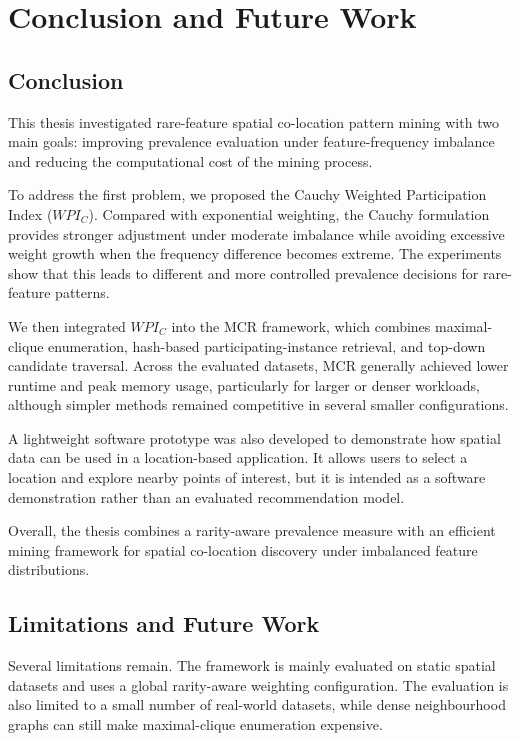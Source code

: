 \documentclass[12pt, letterpaper]{template}
\theoremstyle{definition}
\begin{document}
\section{Conclusion and Future Work}\label{con}

\subsection{Conclusion}

This thesis investigated rare-feature spatial co-location pattern mining with
two main goals: improving prevalence evaluation under feature-frequency
imbalance and reducing the computational cost of the mining process.

To address the first problem, we proposed the Cauchy Weighted Participation
Index ($WPI_C$). Compared with exponential weighting, the Cauchy formulation
provides stronger adjustment under moderate imbalance while avoiding excessive
weight growth when the frequency difference becomes extreme. The experiments
show that this leads to different and more controlled prevalence decisions for
rare-feature patterns.

We then integrated $WPI_C$ into the MCR framework, which combines maximal-clique
enumeration, hash-based participating-instance retrieval, and top-down candidate
traversal. Across the evaluated datasets, MCR generally achieved lower runtime
and peak memory usage, particularly for larger or denser workloads, although
simpler methods remained competitive in several smaller configurations.

A lightweight software prototype was also developed to demonstrate how spatial
data can be used in a location-based application. It allows users to select a
location and explore nearby points of interest, but it is intended as a software
demonstration rather than an evaluated recommendation model.

Overall, the thesis combines a rarity-aware prevalence measure with an efficient
mining framework for spatial co-location discovery under imbalanced feature
distributions.


\subsection{Limitations and Future Work}

Several limitations remain. The framework is mainly evaluated on static spatial
datasets and uses a global rarity-aware weighting configuration. The evaluation
is also limited to a small number of real-world datasets, while dense
neighbourhood graphs can still make maximal-clique enumeration expensive.
\end{document}
